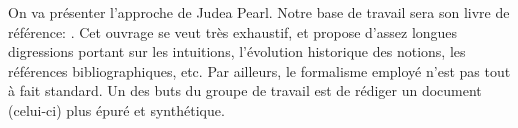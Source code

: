 On va présenter l'approche de Judea Pearl.  Notre base de travail sera
son livre de référence: \cite{pearl2009causality}. Cet ouvrage se veut
très exhaustif, et propose d'assez longues digressions portant sur les
intuitions, l'évolution historique des notions, les références
bibliographiques, etc.  Par ailleurs, le formalisme employé n'est pas
tout à fait standard.  Un des buts du groupe de travail est de rédiger
un document (celui-ci) plus épuré et synthétique.

